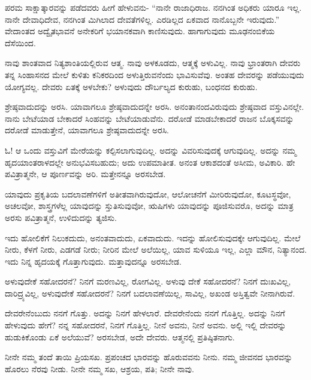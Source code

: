 ಪರಮ ಸಾಕ್ಷಾತ್ಕಾರವನ್ನು ಪಡೆದವರು ಹೀಗೆ ಹೇಳುವನು- “ನಾನೇ ರಾಜಾಧಿರಾಜ. ನನಗಿಂತ ಅಧಿಕರು ಯಾರೂ ಇಲ್ಲ. ನಾನೇ ದೇವಾಧಿದೇವ, ನನಗಿಂತ ಮಿಗಿಲಾದ ದೇವತೆಗಳಿಲ್ಲ. ಎರಡಿಲ್ಲದ ಏಕವಾದ ನಾನೊಬ್ಬನೇ ಇರುವುದು.” ವೇದಾಂತದ ಅದ್ವೈತಭಾವನೆ ಅನೇಕರಿಗೆ ಭಯಾನಕವಾಗಿ ಕಾಣಿಸುವುದು. ಹಾಗಾಗುವುದು ಮೂಢನಂಬಿಕೆಯ ದೆಸೆಯಿಂದ.

ನಾವು ಶಾಂತವಾದ ನಿತ್ಯಶಾಂತಿಯಲ್ಲಿರುವ ಆತ್ಮ. ನಾವು ಅಳಕೂಡದು, ಆತ್ಮಕ್ಕೆ ಅಳುವಿಲ್ಲ. ನಾವು ಭ್ರಾಂತರಾಗಿ ದೇವರು ತನ್ನ ಸಿಂಹಾಸನದ ಮೇಲೆ ಕುಳಿತು ಕನಿಕರದಿಂದ ಅಳುತ್ತಿರುವನೆಂದು ಭಾವಿಸುವೆವು. ಅಂತಹ ದೇವರನ್ನು ಪಡೆಯುವುದು ಯೋಗ್ಯವಲ್ಲ. ದೇವರು ಏತಕ್ಕೆ ಅಳಬೇಕು? ಅಳುವುದು ದೌರ್ಬಲ್ಯದ ಕುರುಹು, ಬಂಧನದ ಕುರುಹು.

ಶ್ರೇಷ್ಠವಾದುದನ್ನು ಅರಸಿ. ಯಾವಾಗಲೂ ಶ್ರೇಷ್ಠವಾದುದನ್ನೇ ಅರಸಿ. ಅನಂತಾನಂದವಿರುವುದು ಶ್ರೇಷ್ಠವಾದ ವಸ್ತುವಿನಲ್ಲೇ. ನಾನು ಬೇಟೆಯಾಡ ಬೇಕಾದರೆ ಸಿಂಹವನ್ನು ಬೇಟೆಯಾಡುವೆನು. ದರೋಡೆ ಮಾಡಬೇಕಾದರೆ ರಾಜನ ಬೊಕ್ಕಸವನ್ನು ದರೋಡೆ ಮಾಡುತ್ತೇನೆ, ಯಾವಾಗಲೂ ಶ್ರೇಷ್ಠವಾದುದನ್ನೇ ಅರಸಿ.

ಓ! ಆ ಒಂದು ವಸ್ತುವಿಗೆ ಮೇರೆಯನ್ನು ಕಲ್ಪಿಸಲಾಗುವುದಿಲ್ಲ. ಅದನ್ನು ವಿವರಿಸುವುದಕ್ಕೆ ಆಗುವುದಿಲ್ಲ. ಅದನ್ನು ನಮ್ಮ ಹೃದಯಾಂತರಾಳದಲ್ಲೇ ಅನುಭವಿಸಬಹುದು; ಅದು ಉಪಮಾತೀತ. ಅನಂತ ಆಕಾಶದಂತೆ ಅಸೀಮ, ಅವಿಕಾರಿ. ಹೇ ಪವಿತ್ರಾತ್ಮನೇ, ಆ ಪೂರ್ಣವನ್ನು ಅರಿ. ಮತ್ತೇನನ್ನೂ ಅರಸಬೇಡ.

ಯಾವುದು ಪ್ರಕೃತಿಯ ಬದಲಾವಣೆಗಳಿಗೆ ಅತೀತವಾಗಿರುವುದೋ, ಆಲೋಚನೆಗೆ ಮೀರಿರುವುದೋ, ಕೂಟಸ್ಥವೋ, ಅಚಲವೋ, ಶಾಸ್ತ್ರಗಳೆಲ್ಲ ಯಾವುದನ್ನು ಸ್ತುತಿಸುವುವೋ, ಋಷಿಗಳು ಯಾವುದನ್ನು ಪೂಜಿಸುವರೊ, ಅದನ್ನು ಮಾತ್ರ ಅರಸು ಪವಿತ್ರಾತ್ಮನೆ, ಉಳಿದುದನ್ನು ತ್ಯಜಿಸು.

ಇದು ಹೋಲಿಕೆಗೆ ನಿಲುಕದುದು, ಅನಂತವಾದುದು, ಏಕವಾದುದು. ಇದನ್ನು ಹೋಲಿಸುವುದಕ್ಕೇ ಆಗುವುದಿಲ್ಲ. ಮೇಲೆ ನೀರು, ಕೆಳಗೆ ನೀರು, ಎಡಗಡೆ ನೀರು; ನೀರಿನ ಮೇಲೆ ಅಲೆಯಿಲ್ಲ, ಯಾವ ಸುಳಿಯೂ ಇಲ್ಲ, ಎಲ್ಲಾ ಮೌನ, ನಿತ್ಯಾನಂದ. ಇದು ನಿನ್ನ ಹೃದಯಕ್ಕೆ ಗೊತ್ತಾಗುವುದು. ಮತ್ತಾವುದನ್ನೂ ಅರಸಬೇಡ.

ಅಳುವುದೇಕೆ ಸಹೋದರನೆ? ನಿನಗೆ ಮರಣವಿಲ್ಲ, ರೋಗವಿಲ್ಲ. ಅಳುವು ದೇಕೆ ಸಹೋದರನೆ? ನಿನಗೆ ದುಃಖವಿಲ್ಲ, ದಾರಿದ್ರ್ಯವಿಲ್ಲ, ಅಳುವುದೇಕೆ ಸಹೋದರನೆ? ನಿನಗೆ ಬದಲಾವಣೆಯಿಲ್ಲ, ಸಾವಿಲ್ಲ, ಅಖಂಡ ಅಸ್ತಿತ್ವವೇ ನೀನಾಗಿರುವೆ.

ದೇವರೇನೆಂಬುದು ನನಗೆ ಗೊತ್ತು. ಅದನ್ನು ನಿನಗೆ ಹೇಳಲಾರೆ. ದೇವರೇನೆಂದು ನನಗೆ ಗೊತ್ತಿಲ್ಲ. ಅದನ್ನು ನಿನಗೆ ಹೇಳುವುದು ಹೇಗೆ? ನನ್ನ ಸಹೋದರನೆ, ನಿನಗೆ ಗೊತ್ತಿಲ್ಲ. ನೀನೆ ಅವನು, ನೀನೆ ಅವನು. ಅಲ್ಲಿ ಇಲ್ಲಿ ದೇವರನ್ನು ಹುಡುಕಿಕೊಂಡು ಏಕೆ ಅಲೆಯುವೆ? ಅರಸಬೇಡ, ಅದೇ ದೇವರು. ಆತ್ಮನಲ್ಲಿ ಪ್ರತಿಷ್ಠಿತನಾಗು.

ನೀನೇ ನಮ್ಮ ತಂದೆ ತಾಯಿ ಪ್ರಿಯಸಖ. ಪ್ರಪಂಚದ ಭಾರವನ್ನು ಹೊರುವವನು ನೀನು. ನಮ್ಮ ಜೀವನದ ಭಾರವನ್ನು ಹೊರಲು ನೆರವು ನೀಡು. ನೀನೇ ನಮ್ಮ ಸಖ, ಆಶ್ರಯ, ಪತಿ; ನೀನೇ ನಾವು.

